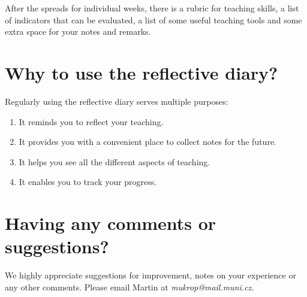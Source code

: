 After the spreads for individual weeks, there is a rubric for teaching skills, a list of indicators that can be evaluated, a list of some useful teaching tools and some extra space for your notes and remarks.

\section*{Why to use the reflective diary?}

Regularly using the reflective diary serves multiple purposes:
\begin{enumerate}[topsep=0pt]
\item It reminds you to reflect your teaching.
\item It provides you with a convenient place to collect notes for the future.
\item It helps you see all the different aspects of teaching.
\item It enables you to track your progress.
\end{enumerate}

\section*{Having any comments or suggestions?}

We highly appreciate suggestions for improvement, notes on your experience or any other comments. Please email Martin at \textit{mukrop@mail.muni.cz.}
